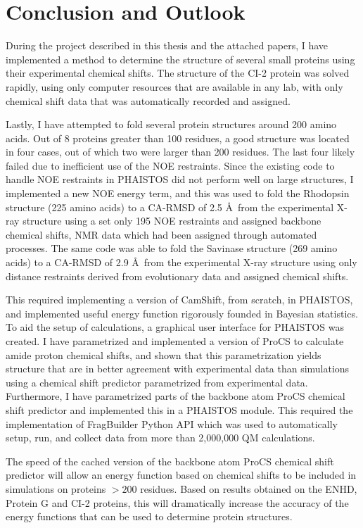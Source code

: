 \chapter{Conclusion and Outlook}

During the project described in this thesis and the attached papers, I have implemented a method to determine the structure of several small proteins using their experimental chemical shifts.
The structure of the CI-2 protein was solved rapidly, using only computer resources that are available in any lab, with only chemical shift data that was automatically recorded and assigned.

Lastly, I have attempted to fold several protein structures around 200 amino acids.
Out of 8 proteins greater than 100 residues, a good structure was located in four cases, out of which two were larger than 200 residues.
The last four likely failed due to inefficient use of the NOE restraints.
Since the existing code to handle NOE restraints in PHAISTOS did not perform well on large structures, I implemented a new NOE energy term, and this was used to fold the Rhodopsin structure (225 amino acids) to a CA-RMSD of 2.5 \AA~from the experimental X-ray structure using a set only 195 NOE restraints and assigned backbone chemical shifts, NMR data which had been assigned through automated processes.
The same code was able to fold the Savinase structure (269 amino acids) to a CA-RMSD of 2.9 \AA~from the experimental X-ray structure using only distance restraints derived from evolutionary data and assigned chemical shifts.

This required implementing a version of CamShift, from scratch, in PHAISTOS, and implemented useful energy function rigorously founded in Bayesian statistics.
To aid the setup of calculations, a graphical user interface for PHAISTOS was created.
I have parametrized and implemented a version of ProCS to calculate amide proton chemical shifts, and shown that this parametrization yields structure that are in better agreement with experimental data than simulations using a chemical shift predictor parametrized from experimental data.
Furthermore, I have parametrized parts of the backbone atom ProCS chemical shift predictor and implemented this in a PHAISTOS module.
This required the implementation of FragBuilder Python API which was used to automatically setup, run, and collect data from more than 2,000,000 QM calculations.

The speed of the cached version of the backbone atom ProCS chemical shift predictor will allow an energy function based on chemical shifts to be included in simulations on proteins $>200$ residues. Based on results obtained on the ENHD, Protein G and CI-2 proteins, this will dramatically increase the accuracy of the energy functions that can be used to determine protein structures.

